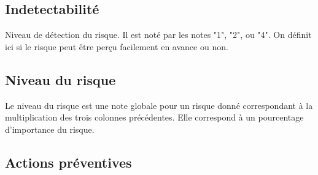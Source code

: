 \documentclass[etudiants]{support-iutrs}
\begin{document}
\subsection{Indetectabilité}
Niveau de détection du risque. Il est noté par les notes "1", "2", ou "4". On définit ici si le risque peut être perçu facilement en avance ou non.

\subsection{Niveau du risque}
Le niveau du risque est une note globale pour un risque donné correspondant à la multiplication des trois colonnes précédentes. Elle correspond à un pourcentage d'importance du risque.

\subsection{Actions préventives}
\end{document}
